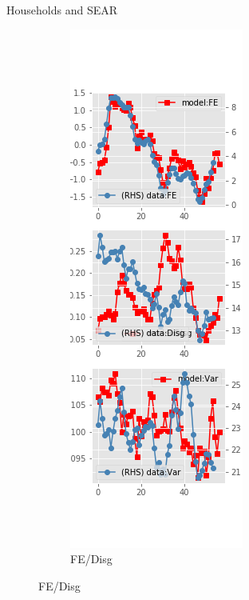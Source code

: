 \documentclass{beamer}
\begin{document}
\begin{frame}{Households and SEAR}
\begin{figure}[ht]
\begin{subfigure}[b]{0.2\textwidth}
		\end{subfigure}
		\hfill
	\begin{subfigure}[b]{0.2\textwidth}
		\caption{FE/Disg}
		\includegraphics[width=\textwidth, height = 0.8\textheight]{figuresDraft/sce_se_est_diag2.png}
	\end{subfigure}
	\end{figure}
\end{frame}
\end{document}
